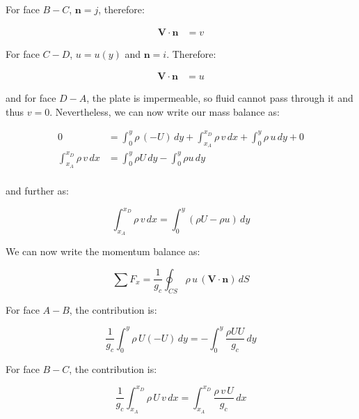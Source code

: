 \documentclass[letterpaper,12pt]{article}
\begin{document}
For face $B-C$, $\mathbf{n} = j$, therefore:

\begin{equation}
\begin{aligned}
    \mathbf{V} \cdot \mathbf{n} &= v
\end{aligned}
\end{equation}

For face $C-D$, $u = u(y)$ and $\mathbf{n} = i$. Therefore:

\begin{equation}
\begin{aligned}
    \mathbf{V} \cdot \mathbf{n} &= u
\end{aligned}
\end{equation}

and for face $D-A$, the plate is impermeable, so fluid cannot pass through it and thus $v = 0$. Nevertheless, we can now write our mass balance as:

\begin{equation}
\begin{aligned}
    0                           &= \int_0^y\rho\,(-U)\,dy+\int_{x_A}^{x_D}\rho\,v\,dx+\int_0^y\rho\,u\,dy+0 \\
    \int_{x_A}^{x_D}\rho\,v\,dx &= \int_0^y\rho U\,dy-\int_0^y\rho u\,dy \\ 
\end{aligned}
\end{equation}

and further as:

\begin{equation}
\boxed{
    \int_{x_A}^{x_D}\rho\,v\,dx = \int_0^y(\rho U-\rho u)\,dy
}
\end{equation}

We can now write the momentum balance as:

\begin{equation}
    \sum F_x=\frac{1}{g_c}\oint_{CS}\rho\,u\,(\mathbf V\cdot\mathbf n)\,dS
\end{equation}


For face $A-B$, the contribution is:

\begin{equation}
    \frac{1}{g_c}\int_0^y\rho\,U(-U)\,dy=-\int_0^y\frac{\rho UU}{g_c}\,dy
\end{equation}

For face $B-C$, the contribution is:

\begin{equation}
    \frac{1}{g_c}\int_{x_A}^{x_D}\rho\,U\,v\,dx=\int_{x_A}^{x_D}\frac{\rho\,v\,U}{g_c}\,dx
\end{equation}
\end{document}
